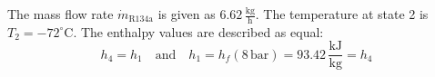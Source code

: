 The mass flow rate \( \dot{m}_{\text{R134a}} \) is given as \( 6.62 \, \frac{\text{kg}}{\text{h}} \).  
The temperature at state 2 is \( T_2 = -72^\circ\text{C} \).  
The enthalpy values are described as equal:  
\[
h_4 = h_1 \quad \text{and} \quad h_1 = h_f(8 \, \text{bar}) = 93.42 \, \frac{\text{kJ}}{\text{kg}} = h_4
\]